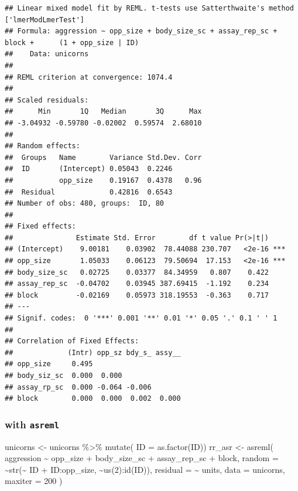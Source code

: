 \documentclass[
  12pt,
]{book}
\newenvironment{Shaded}{\begin{snugshade}}{\end{snugshade}}
\newcommand{\AttributeTok}[1]{\textcolor[rgb]{0.77,0.63,0.00}{#1}}
\newcommand{\DecValTok}[1]{\textcolor[rgb]{0.00,0.00,0.81}{#1}}
\newcommand{\FunctionTok}[1]{\textcolor[rgb]{0.00,0.00,0.00}{#1}}
\newcommand{\NormalTok}[1]{#1}
\newcommand{\OtherTok}[1]{\textcolor[rgb]{0.56,0.35,0.01}{#1}}
\newcommand{\SpecialCharTok}[1]{\textcolor[rgb]{0.00,0.00,0.00}{#1}}
\begin{document}
\begin{verbatim}
## Linear mixed model fit by REML. t-tests use Satterthwaite's method ['lmerModLmerTest']
## Formula: aggression ~ opp_size + body_size_sc + assay_rep_sc + block +      (1 + opp_size | ID)
##    Data: unicorns
## 
## REML criterion at convergence: 1074.4
## 
## Scaled residuals: 
##      Min       1Q   Median       3Q      Max 
## -3.04932 -0.59780 -0.02002  0.59574  2.68010 
## 
## Random effects:
##  Groups   Name        Variance Std.Dev. Corr
##  ID       (Intercept) 0.05043  0.2246       
##           opp_size    0.19167  0.4378   0.96
##  Residual             0.42816  0.6543       
## Number of obs: 480, groups:  ID, 80
## 
## Fixed effects:
##               Estimate Std. Error        df t value Pr(>|t|)    
## (Intercept)    9.00181    0.03902  78.44088 230.707   <2e-16 ***
## opp_size       1.05033    0.06123  79.50694  17.153   <2e-16 ***
## body_size_sc   0.02725    0.03377  84.34959   0.807    0.422    
## assay_rep_sc  -0.04702    0.03945 387.69415  -1.192    0.234    
## block         -0.02169    0.05973 318.19553  -0.363    0.717    
## ---
## Signif. codes:  0 '***' 0.001 '**' 0.01 '*' 0.05 '.' 0.1 ' ' 1
## 
## Correlation of Fixed Effects:
##             (Intr) opp_sz bdy_s_ assy__
## opp_size     0.495                     
## body_siz_sc  0.000  0.000              
## assay_rp_sc  0.000 -0.064 -0.006       
## block        0.000  0.000  0.002  0.000
\end{verbatim}

\hypertarget{with-asreml}{%
\subsubsection{\texorpdfstring{with \texttt{asreml}}{with asreml}}\label{with-asreml}}

\begin{Shaded}
\begin{Highlighting}[]
\NormalTok{unicorns }\OtherTok{\textless{}{-}}\NormalTok{ unicorns }\SpecialCharTok{\%\textgreater{}\%}
  \FunctionTok{mutate}\NormalTok{( }\AttributeTok{ID =} \FunctionTok{as.factor}\NormalTok{(ID))}
\NormalTok{rr\_asr }\OtherTok{\textless{}{-}} \FunctionTok{asreml}\NormalTok{(}
\NormalTok{  aggression }\SpecialCharTok{\textasciitilde{}}\NormalTok{ opp\_size }\SpecialCharTok{+}\NormalTok{ body\_size\_sc }\SpecialCharTok{+}\NormalTok{ assay\_rep\_sc }\SpecialCharTok{+}\NormalTok{ block,}
  \AttributeTok{random =} \SpecialCharTok{\textasciitilde{}}\FunctionTok{str}\NormalTok{(}\SpecialCharTok{\textasciitilde{}}\NormalTok{ ID }\SpecialCharTok{+}\NormalTok{ ID}\SpecialCharTok{:}\NormalTok{opp\_size, }\SpecialCharTok{\textasciitilde{}}\FunctionTok{us}\NormalTok{(}\DecValTok{2}\NormalTok{)}\SpecialCharTok{:}\FunctionTok{id}\NormalTok{(ID)),}
  \AttributeTok{residual =} \SpecialCharTok{\textasciitilde{}}\NormalTok{ units,}
  \AttributeTok{data =}\NormalTok{ unicorns,}
  \AttributeTok{maxiter =} \DecValTok{200}
\NormalTok{)}
\end{Highlighting}
\end{Shaded}
\end{document}
